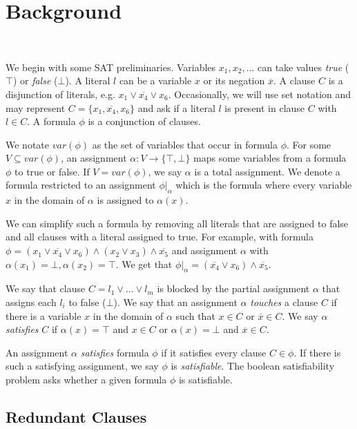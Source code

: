 \section{Background}~\label{sec:background}

We begin with some SAT preliminaries. Variables $x_1, x_2, ...$ can take values \emph{true} ($\top$) or \emph{false} ($\bot$). A literal $l$ can be a variable $x$ or its negation $\overline{x}$. A clause $C$ is a disjunction of literals, e.g. $x_1 \lor \overline{x_4} \lor x_6$. Occasionally, we will use set notation and may represent $C = \{x_1, \overline{x_4}, x_6\}$ and ask if a literal $l$ is present in clause $C$ with $l \in C$. A formula $\phi$ is a conjunction of clauses.

We notate $var(\phi)$ as the set of variables that occur in formula $\phi$. For some $V \subseteq var(\phi)$, an assignment $\alpha : V \rightarrow \{\top, \bot\}$  maps some variables from a formula $\phi$ to true or false. If $V = var(\phi)$, we say $\alpha$ is a total assignment. We denote a formula restricted to an assignment $\phi|_\alpha$ which is the formula where every variable $x$ in the domain of $\alpha$ is assigned to $\alpha(x)$.

We can simplify such a formula by removing all literals that are assigned to false and all clauses with a literal assigned to true. For example, with formula $\phi = (x_1 \lor \overline{x_4} \lor x_6) \land (x_2 \lor x_3) \land \overline{x_5}$ and assignment $\alpha$ with $\alpha(x_1) = \bot, \alpha(x_2) = \top$. We get that $\phi|_\alpha = (\overline{x_4} \lor x_6) \land \overline{x_5}$.

We say that clause $C = l_1 \lor ... \lor l_m$ is blocked by the partial assignment $\alpha$ that assigns each $l_i$ to false ($\bot$).
We say that an assignment $\alpha$ \emph{touches} a clause $C$ if there is a variable $x$ in the domain of $\alpha$ such that $x \in C$ or $\overline{x} \in C$. We say $\alpha$ \emph{satisfies} $C$ if $\alpha(x) = \top$ and $x \in C$ or $\alpha(x) = \bot$ and $\overline{x} \in C$.

An assignment $\alpha$ \emph{satisfies} formula $\phi$ if it satisfies every clause $C \in \phi$. If there is such a satisfying assignment, we say $\phi$ is \emph{satisfiable}. The boolean satisfiability problem asks whether a given formula $\phi$ is satisfiable.

\subsection{Redundant Clauses}~\label{subsec:redundant}


